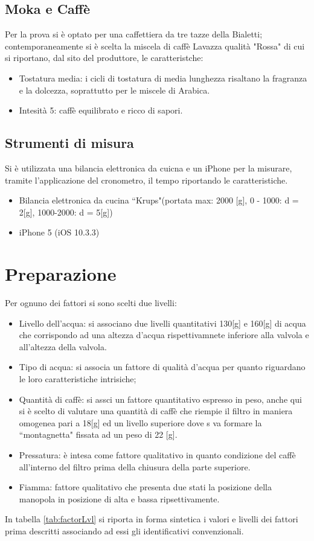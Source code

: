 \subsection{Moka e Caffè}
Per la prova si è optato per una caffettiera da tre tazze della Bialetti; contemporaneamente si è scelta la miscela di caffè Lavazza qualità "Rossa" di cui si riportano, dal sito del produttore\cite{Lavazza_2017}, le caratteristche:
\begin{itemize}
  \item Tostatura media: i cicli di tostatura di media lunghezza risaltano la fragranza e la dolcezza, soprattutto per le miscele di Arabica.
  \item Intesità 5: caffè equilibrato e ricco di sapori.
\end{itemize}
\subsection{Strumenti di misura}
Si è utilizzata una bilancia elettronica da cuicna e un iPhone per la misurare, tramite l'applicazione del cronometro, il tempo riportando le caratteristiche.
\begin{itemize}
  \item Bilancia elettronica da cucina “Krups"(portata max: 2000 [g], 0 - 1000: d = 2[g], 1000-2000: d = 5[g])
  \item iPhone 5 (iOS 10.3.3)
\end{itemize}


\section{Preparazione}
Per ognuno dei fattori si sono scelti due livelli:
\begin{itemize}
  \item Livello dell'acqua: si associano due livelli quantitativi 130[g] e 160[g] di acqua che corrispondo ad una altezza d'acqua rispettivamnete inferiore alla valvola e all'altezza della valvola.
  \item Tipo di acqua: si associa un fattore di qualità d'acqua per quanto riguardano le loro caratteristiche intrisiche;
  \item Quantità di caffè: si assci un fattore quantitativo espresso in peso, anche qui si è scelto di valutare una quantità di caffè che riempie il filtro in maniera omogenea pari a 18[g] ed un livello superiore dove s va formare la “montagnetta" fissata ad un peso di 22 [g].
  \item Pressatura: è intesa come fattore qualitativo in quanto condizione del caffè all'interno del filtro prima della chiusura della parte superiore.
  \item Fiamma: fattore qualitativo che presenta due stati la posizione della manopola in posizione di alta e bassa ripsettivamente.
\end{itemize}
In tabella \ref{tab:factorLvl} si riporta in forma sintetica i valori e livelli dei fattori prima descritti associando ad essi gli identificativi convenzionali.

